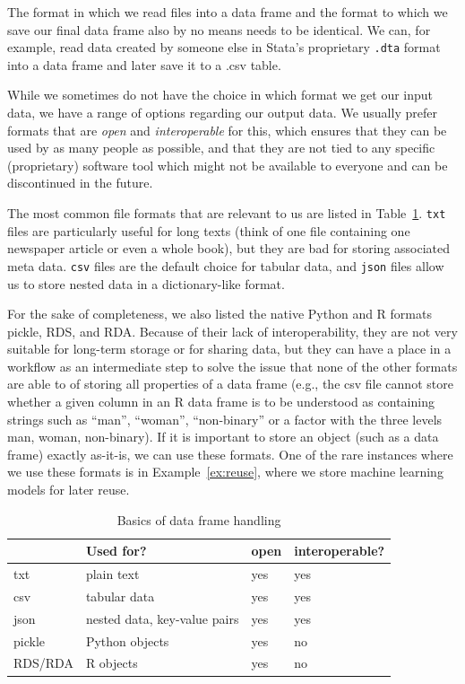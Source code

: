 The format in which we read files into a data frame and the format to which we save our final data frame also by no means needs to be identical. We can, for example, read data created by someone else in Stata's proprietary
\verb|.dta| format into a data frame and later save it to a .csv table.

While we sometimes do not have the choice in which format we get our input data, we have a range of options regarding our output data. We usually prefer formats that are \emph{open} and \emph{interoperable} for this, which ensures that they can be used by as many people as possible, and that they are not tied to any specific (proprietary) software tool which might not be available to everyone and can be discontinued in the future.

The most common file formats that are relevant to us are listed in Table~\ref{tab:fileformats}. \verb|txt| files are particularly useful for long texts (think of one file containing one newspaper article or even a whole book), but they are bad for storing associated meta data. \verb|csv| files are the default choice for tabular data, and \verb|json| files allow us to store nested data in a dictionary-like format.

For the sake of completeness, we also listed the native Python and R formats pickle, RDS, and RDA. Because of their lack of interoperability, they are not very suitable for long-term storage or for sharing data, but they can have a place in a workflow as an intermediate step to solve the issue that none of the other formats are able to of storing all properties of a data frame (e.g., the csv file cannot store whether a given column in an R data frame is to be understood as containing strings such as ``man'', ``woman'', ``non-binary'' or a factor with the three levels man, woman, non-binary). If it is important to store an object (such as a data frame) exactly as-it-is, we can use these formats. One of the rare instances where we use these formats is in Example~\ref{ex:reuse}, where we store machine learning models for later reuse.

\begin{table}[]
\caption{\label{tab:fileformats} Basics of data frame handling}{%
\begin{tabular}{@{}llll@{}}
\toprule
        & Used for?             & open   & interoperable?\\ \midrule
txt     & plain text            &yes & yes            \\
csv     & tabular data          & yes & yes            \\
json    & nested data, key-value pairs   & yes & yes             \\
pickle  & Python objects        & yes & no     \\
RDS/RDA & R objects             & yes & no \\ \bottomrule
\end{tabular}}{}
\end{table}


